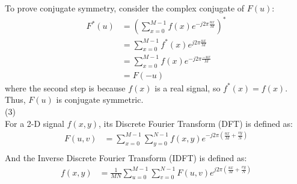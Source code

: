 \documentclass[UTF8]{ctexart}
\begin{document}
To prove conjugate symmetry, consider the complex conjugate of \( F(u) \):
\[
\begin{aligned}
F^*(u) &= \left( \sum_{x=0}^{M-1} f(x) e^{-j2\pi \frac{ux}{M}} \right)^* \\
&= \sum_{x=0}^{M-1} f^*(x) e^{j2\pi \frac{ux}{M}} \\
&= \sum_{x=0}^{M-1} f(x) e^{-j2\pi \frac{-ux}{M}} \\
&= F(-u)
\end{aligned}
\]
where the second step is because \( f(x) \) is a real signal, so \( f^*(x) = f(x) \).\\
Thus, \( F(u) \) is conjugate symmetric.\\
(3)\\
For a 2-D signal $f(x,y)$, its Discrete Fourier Transform (DFT) is defined as:
\begin{equation}
    \begin{aligned}
        F(u, v) &= \sum_{x=0}^{M-1} \sum_{y=0}^{N-1} f(x, y) e^{-j2\pi \left( \frac{ux}{M} + \frac{vy}{N} \right)} \\
    \end{aligned}
\end{equation}
And the Inverse Discrete Fourier Transform (IDFT) is defined as:
\begin{equation}
    \begin{aligned}
        f(x, y) &= \frac{1}{MN} \sum_{u=0}^{M-1} \sum_{v=0}^{N-1} F(u, v) e^{j2\pi \left( \frac{ux}{M} + \frac{vy}{N} \right)} \\
    \end{aligned}
\end{equation}
\end{document}
